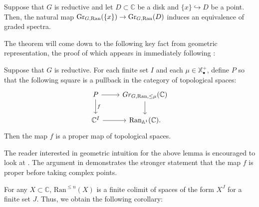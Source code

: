 \begin{prop}\label{prop:diskequiv}
Suppose that $G$ is reductive and let $D\subset \mathbb{C}$ be a disk and $\{x \} \hookrightarrow D$ be a point.  Then, the natural map $\operatorname{\mathrm{Gr}}_{G,\operatorname{\mathrm{Ran}}}(\{x\}) \to \operatorname{\mathrm{Gr}}_{G,\operatorname{\mathrm{Ran}}}(D)$ induces an equivalence of graded spectra.  
\end{prop}

The theorem will come down to the following key fact from geometric representation, the proof of which appears in \cite{BDQuantization} immediately following \cite[5.3.10]{BDQuantization}:

\begin{lem} \label{lem:grproper}
Suppose that $G$ is reductive.  For each finite set $I$ and each $\mu \in \mathbb{X}_{\bullet}^+$, define $P$ so that the following square is a pullback in the category of topological spaces:
$$
\begin{tikzcd}
P \arrow{r} \arrow{d}{f} & Gr_{G,\text{Ran},\le \mu}(\mathbb{C}) \arrow{d} \\
\mathbb{C}^I \arrow{r} & \text{Ran}_{\mathbb{A}^1}(\mathbb{C}).
\end{tikzcd}
$$
Then the map $f$ is a proper map of topological spaces.
\end{lem}

\begin{rmk}
The reader interested in geometric intuition for the above lemma is encouraged to look at \cite[Proposition 1.2.4]{ZhuDemazure}.  The argument in \cite{BDQuantization} demonstrates the stronger statement that the map $f$ is proper before taking complex points.
\end{rmk}

\begin{comment}
We also need the following point-set lemma:
\begin{lem}\label{lem:colimproper}
Let $I$ be a finite indexing category and $\{X_i\}_{i\in I}$ be a diagram of topological spaces indexed by $I$.  Let $X = \colim_{i\in I} X_i$ and suppose $f: Y \to X$ is a map of topological spaces with the property that for all $i\in I$, the natural map $f_i: Y\times_X X_i \to X_i$ is proper.  Then the map $f$ is proper.
\end{lem}
\begin{proof}
****write some shit or not?****
\end{proof}
\end{comment}

For any $X\subset \mathbb{C}$, $\mathrm{Ran}^{\leq n}(X)$ is a finite colimit of spaces of the form $X^J$ for a finite set $J$.  Thus, we obtain the following corollary:


